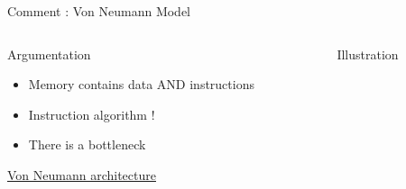 \begin{Frame}{Comment :  Von Neumann Model}
\begin{columns}[t]
\begin{column}{\BW}
\begin{block}{Argumentation}
\begin{itemize}
\item Memory contains data AND instructions
\item Instruction algorithm !
\item There is a bottleneck
\end{itemize}
\href{https://en.wikipedia.org/wiki/Von_Neumann_architecture}{Von
  Neumann architecture}
\end{block}

\end{column}
\begin{column}{\BW}
\begin{block}{Illustration}
\end{block}

\end{column}

\end{columns}

\end{Frame}

